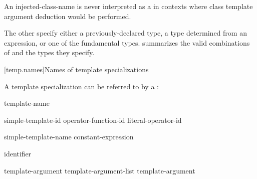\documentclass{wg21}
\begin{document}
\begin{note}
	An injected-class-name is never interpreted as a 
	in contexts where class template argument deduction would be performed.
\end{note}
The other
specify either a previously-declared type, a type determined from an
expression, or one of the
fundamental types.
summarizes the valid combinations of
and the types they specify.

[temp.names]{Names of template specializations}

\pnum
A template specialization can be referred to by a
:

\begin{bnf}
    \br
    template-name \terminal{<}  \terminal{>}
\end{bnf}

\begin{bnf}
    \br
    simple-template-id\br
    operator-function-id \terminal{<}  \terminal{>}\br
    literal-operator-id \terminal{<}  \terminal{>}
\end{bnf}

\begin{bnf}
    \br
     \br
    \br
\end{bnf}

\begin{addedblock}
\begin{bnf}
    \br
    simple-template-name  \terminal{[} constant-expression \terminal{]}
\end{bnf}

\begin{bnf}
    \br
    identifier
\end{bnf}
\end{addedblock}

\begin{bnf}
    \br
    template-argument \br
    template-argument-list \terminal{,} template-argument 
\end{bnf}
\end{document}

